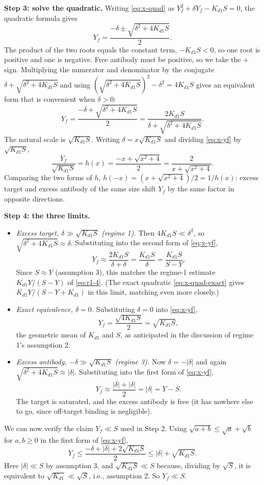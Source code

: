 \textbf{Step 3: solve the quadratic.} Writing \eqref{eq:x-quad} as
$Y_f^2+\delta Y_f-K_{d1}S=0$, the quadratic formula gives
$$
Y_f=\frac{-\delta\pm\sqrt{\delta^2+4K_{d1}S}}{2}.
$$
The product of the two roots equals the constant term, $-K_{d1}S<0$, so one
root is positive and one is negative. Free antibody must be positive, so
we take the $+$ sign. Multiplying the numerator and denominator by the
conjugate $\delta+\sqrt{\delta^2+4K_{d1}S}$ and using
$(\sqrt{\delta^2+4K_{d1}S})^2-\delta^2=4K_{d1}S$ gives an equivalent form
that is convenient when $\delta>0$:
\begin{equation}
Y_f
=\frac{-\delta+\sqrt{\delta^2+4K_{d1}S}}{2}
=\frac{2K_{d1}S}{\delta+\sqrt{\delta^2+4K_{d1}S}}.
\label{eq:x-yf}
\end{equation}
The natural scale is $\sqrt{K_{d1}S}$. Writing
$\delta=x\sqrt{K_{d1}S}$ and dividing \eqref{eq:x-yf} by $\sqrt{K_{d1}S}$,
\begin{equation}
\frac{Y_f}{\sqrt{K_{d1}S}}
=h(x)
=\frac{-x+\sqrt{x^2+4}}{2}
=\frac{2}{x+\sqrt{x^2+4}}.
\label{eq:x-h}
\end{equation}
Comparing the two forms of $h$, $h(-x)=(x+\sqrt{x^2+4})/2=1/h(x)$: excess
target and excess antibody of the same size shift $Y_f$ by the same factor
in opposite directions.

\textbf{Step 4: the three limits.}
\begin{itemize}
    \item \emph{Excess target, $\delta\gg\sqrt{K_{d1}S}$ (regime 1).} Then
    $4K_{d1}S\ll\delta^2$, so $\sqrt{\delta^2+4K_{d1}S}\approx\delta$.
    Substituting into the second form of \eqref{eq:x-yf},
    $$
    Y_f\approx\frac{2K_{d1}S}{\delta+\delta}=\frac{K_{d1}S}{\delta}
    =\frac{K_{d1}S}{S-Y}.
    $$
    Since $S\approx Y$ (assumption 3), this matches the regime-1 estimate
    $K_{d1}Y/(S-Y)$ of \eqref{eq:r1-4}. (The exact quadratic
    \eqref{eq:x-quad-exact} gives $K_{d1}Y/(S-Y+K_{d1})$ in this limit,
    matching even more closely.)
    \item \emph{Exact equivalence, $\delta=0$.} Substituting
    $\delta=0$ into \eqref{eq:x-yf},
    $$
    Y_f=\frac{\sqrt{4K_{d1}S}}{2}=\sqrt{K_{d1}S},
    $$
    the geometric mean of $K_{d1}$ and $S$, as anticipated in the
    discussion of regime 1's assumption 2.
    \item \emph{Excess antibody, $-\delta\gg\sqrt{K_{d1}S}$ (regime 3).}
    Now $\delta=-|\delta|$ and again $\sqrt{\delta^2+4K_{d1}S}\approx|\delta|$.
    Substituting into the first form of \eqref{eq:x-yf},
    $$
    Y_f\approx\frac{|\delta|+|\delta|}{2}=|\delta|=Y-S.
    $$
    The target is saturated, and the excess antibody is free (it has
    nowhere else to go, since off-target binding is negligible).
\end{itemize}
We can now verify the claim $Y_f\ll S$ used in Step 2. Using
$\sqrt{a+b}\le\sqrt a+\sqrt b$ for $a,b\ge0$ in the first form of
\eqref{eq:x-yf},
$$
Y_f\le\frac{-\delta+|\delta|+2\sqrt{K_{d1}S}}{2}\le|\delta|+\sqrt{K_{d1}S}.
$$
Here $|\delta|\ll S$ by assumption 3, and $\sqrt{K_{d1}S}\ll S$ because,
dividing by $\sqrt S$, it is equivalent to $\sqrt{K_{d1}}\ll\sqrt S$, i.e.,
assumption 2. So $Y_f\ll S$.

